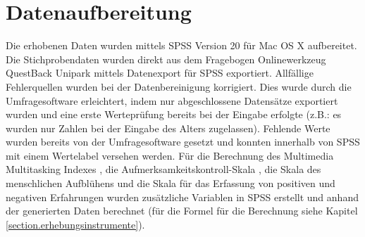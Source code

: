\section{Datenaufbereitung}\label{section.datenaufbereitung}
Die erhobenen Daten wurden mittels SPSS Version 20 für Mac OS X aufbereitet. Die Stichprobendaten wurden direkt aus dem Fragebogen Onlinewerkzeug QuestBack Unipark mittels Datenexport für SPSS exportiert. Allfällige Fehlerquellen wurden bei der Datenbereinigung korrigiert. Dies wurde durch die Umfragesoftware erleichtert, indem nur abgeschlossene Datensätze exportiert wurden und eine erste Werteprüfung bereits bei der Eingabe erfolgte (z.B.: es wurden nur Zahlen bei der Eingabe des Alters zugelassen). Fehlende Werte wurden bereits von der Umfragesoftware gesetzt und konnten innerhalb von SPSS mit einem Wertelabel versehen werden. Für die Berechnung des Multimedia Multitasking Indexes \cite{Ophir2009}, die Aufmerksamkeitskontroll-Skala \cite{Posner1998}, die Skala des menschlichen Aufblühens \cite{Diener:2010} und die Skala für das Erfassung von positiven und negativen Erfahrungen \cite{Diener:2010} wurden zusätzliche Variablen in SPSS erstellt und anhand der generierten Daten berechnet (für die Formel für die Berechnung siehe Kapitel \ref{section.erhebungsinstrumente}). 

